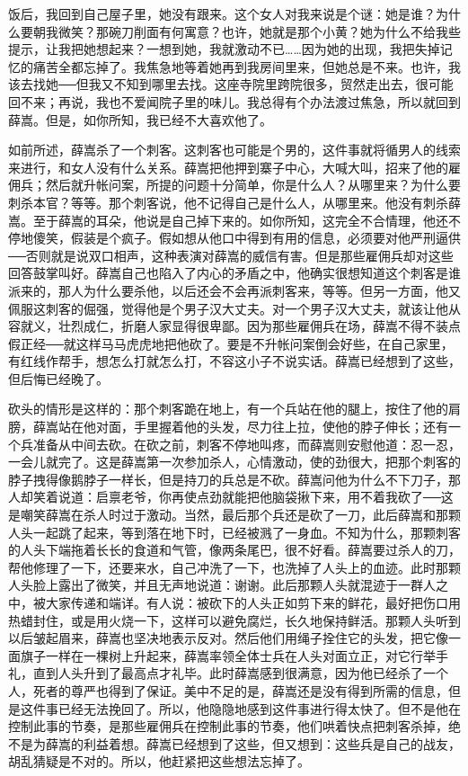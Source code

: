 饭后，我回到自己屋子里，她没有跟来。这个女人对我来说是个谜：她是谁？为什么要朝我微笑？那碗刀削面有何寓意？也许，她就是那个小黄？她为什么不给我些提示，让我把她想起来？一想到她，我就激动不已……因为她的出现，我把失掉记忆的痛苦全都忘掉了。我焦急地等着她再到我房间里来，但她总是不来。也许，我该去找她──但我又不知到哪里去找。这座寺院里跨院很多，贸然走出去，很可能回不来；再说，我也不爱闻院子里的味儿。我总得有个办法渡过焦急，所以就回到薛嵩。但是，如你所知，我已经不大喜欢他了。 

如前所述，薛嵩杀了一个刺客。这刺客也可能是个男的，这件事就将循男人的线索来进行，和女人没有什么关系。薛嵩把他押到寨子中心，大喊大叫，招来了他的雇佣兵；然后就升帐问案，所提的问题十分简单，你是什么人？从哪里来？为什么要刺杀本官？等等。那个刺客说，他不记得自己是什么人，从哪里来。他没有刺杀薛嵩。至于薛嵩的耳朵，他说是自己掉下来的。如你所知，这完全不合情理，他还不停地傻笑，假装是个疯子。假如想从他口中得到有用的信息，必须要对他严刑逼供──否则就是说双口相声，这种表演对薛嵩的威信有害。但是那些雇佣兵却对这些回答鼓掌叫好。薛嵩自己也陷入了内心的矛盾之中，他确实很想知道这个刺客是谁派来的，那人为什么要杀他，以后还会不会再派刺客来，等等。但另一方面，他又佩服这刺客的倔强，觉得他是个男子汉大丈夫。对一个男子汉大丈夫，就该让他从容就义，壮烈成仁，折磨人家显得很卑鄙。因为那些雇佣兵在场，薛嵩不得不装点假正经──就这样马马虎虎地把他砍了。要是不升帐问案倒会好些，在自己家里，有红线作帮手，想怎么打就怎么打，不容这小子不说实话。薛嵩已经想到了这些，但后悔已经晚了。 

砍头的情形是这样的：那个刺客跪在地上，有一个兵站在他的腿上，按住了他的肩膀，薛嵩站在他对面，手里握着他的头发，尽力往上拉，使他的脖子伸长；还有一个兵准备从中间去砍。在砍之前，刺客不停地叫疼，而薛嵩则安慰他道：忍一忍，一会儿就完了。这是薛嵩第一次参加杀人，心情激动，使的劲很大，把那个刺客的脖子拽得像鹅脖子一样长，但是持刀的兵总是不砍。薛嵩问他为什么不下刀子，那人却笑着说道：启禀老爷，你再使点劲就能把他脑袋揪下来，用不着我砍了──这是嘲笑薛嵩在杀人时过于激动。当然，最后那个兵还是砍了一刀，此后薛嵩和那颗人头一起跳了起来，等到落在地下时，已经被溅了一身血。不知为什么，那颗刺客的人头下端拖着长长的食道和气管，像两条尾巴，很不好看。薛嵩要过杀人的刀，帮他修理了一下，还要来水，自己冲洗了一下，也洗掉了人头上的血迹。此时那颗人头脸上露出了微笑，并且无声地说道：谢谢。此后那颗人头就混迹于一群人之中，被大家传递和端详。有人说：被砍下的人头正如剪下来的鲜花，最好把伤口用热蜡封住，或是用火烧一下，这样可以避免腐烂，长久地保持鲜活。那颗人头听到以后皱起眉来，薛嵩也坚决地表示反对。然后他们用绳子拴住它的头发，把它像一面旗子一样在一棵树上升起来，薛嵩率领全体士兵在人头对面立正，对它行举手礼，直到人头升到了最高点才礼毕。此时薛嵩感到很满意，因为他已经杀了一个人，死者的尊严也得到了保证。美中不足的是，薛嵩还是没有得到所需的信息，但是这件事已经无法挽回了。所以，他隐隐地感到这件事进行得太快了。但不是他在控制此事的节奏，是那些雇佣兵在控制此事的节奏，他们哄着快点把刺客杀掉，绝不是为薛嵩的利益着想。薛嵩已经想到了这些，但又想到：这些兵是自己的战友，胡乱猜疑是不对的。所以，他赶紧把这些想法忘掉了。 

